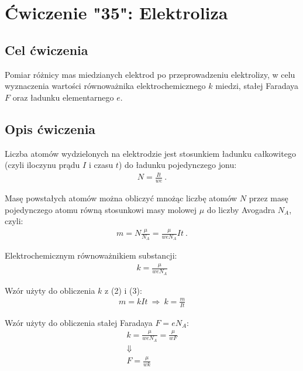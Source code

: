 \documentclass{fizykalab}
\begin{document}
\maketitle
{\setlength{\parindent}{0pt}
\section*{Ćwiczenie "35": Elektroliza}
\subsection*{Cel ćwiczenia}
\par
Pomiar różnicy mas miedzianych elektrod po przeprowadzeniu elektrolizy, w celu 
wyznaczenia wartości równoważnika elektrochemicznego $k$ miedzi, stałej Faradaya $F$ oraz ładunku elementarnego $e$.

\subsection*{Opis ćwiczenia}
\par
Liczba atomów wydzielonych na elektrodzie jest stosunkiem ładunku całkowitego
(czyli iloczynu prądu $I$ i czasu $t$) do ładunku pojedynczego jonu:
\begin{gather*}
	N = \frac{It}{we} \ .
	\tag{1}
\end{gather*}

Masę powstałych atomów można obliczyć mnożąc liczbę atomów $N$ przez masę
pojedynczego atomu równą stosunkowi masy molowej $\mu$ do liczby Avogadra $N_A$, czyli:
\begin{gather*}
	m = N \frac{\mu}{N_A} = \frac{\mu}{weN_A}It \ .
	\tag{2}
\end{gather*}

Elektrochemicznym równoważnikiem substancji:
\begin{gather*}
	k = \frac{\mu}{weN_A}
	\tag{3}
\end{gather*}

Wzór użyty do obliczenia $k$ z (2) i (3):
\begin{gather*}
	m = kIt \ \Rightarrow \ k = \frac{m}{It}
	\tag{4}
\end{gather*}

Wzór użyty do obliczenia stałej Faradaya $F = eN_A$:
\begin{gather*}
	k = \frac{\mu}{weN_A} = \frac{\mu}{wF} \\
	\Downarrow \\
	F = \frac{\mu}{wk}
	\tag{5}
\end{gather*}

}
\end{document}
